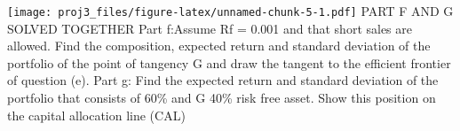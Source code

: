 \documentclass[
]{article}
\newenvironment{Shaded}{\begin{snugshade}}{\end{snugshade}}
\newcommand{\AttributeTok}[1]{\textcolor[rgb]{0.77,0.63,0.00}{#1}}
\newcommand{\ControlFlowTok}[1]{\textcolor[rgb]{0.13,0.29,0.53}{\textbf{#1}}}
\newcommand{\DecValTok}[1]{\textcolor[rgb]{0.00,0.00,0.81}{#1}}
\newcommand{\FloatTok}[1]{\textcolor[rgb]{0.00,0.00,0.81}{#1}}
\newcommand{\FunctionTok}[1]{\textcolor[rgb]{0.00,0.00,0.00}{#1}}
\newcommand{\NormalTok}[1]{#1}
\newcommand{\OtherTok}[1]{\textcolor[rgb]{0.56,0.35,0.01}{#1}}
\newcommand{\SpecialCharTok}[1]{\textcolor[rgb]{0.00,0.00,0.00}{#1}}
\newcommand{\StringTok}[1]{\textcolor[rgb]{0.31,0.60,0.02}{#1}}
\begin{document}
\begin{Shaded}
\end{Shaded}

\texttt{[image: proj3\_files/figure-latex/unnamed-chunk-5-1.pdf]} PART F
AND G SOLVED TOGETHER Part f:Assume Rf = 0.001 and that short sales are
allowed. Find the composition, expected return and standard deviation of
the portfolio of the point of tangency G and draw the tangent to the
efficient frontier of question (e). Part g: Find the expected return and
standard deviation of the portfolio that consists of 60\% and G 40\%
risk free asset. Show this position on the capital allocation line (CAL)
\end{document}
